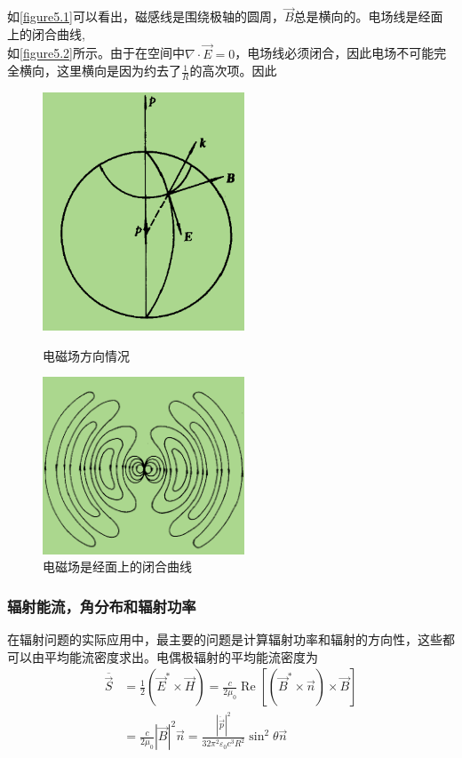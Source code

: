 \documentclass[UTF8]{ctexart}
\begin{document}
\noindent 如\autoref{figure5.1}可以看出，磁感线是围绕极轴的圆周，$\vec{B}$总是横向的。电场线是经面上的闭合曲线,\\如\autoref{figure5.2}所示。由于在空间中$\nabla \cdot \vec{E} = 0$，电场线必须闭合，因此电场不可能完全横向，这里横向是因为约去了$\frac{1}{R}$的高次项。因此
\begin{figure}[htbp]
   \centering
   \begin{minipage}[t]{0.48 \textwidth}
       \centering
       \includegraphics[width=6cm]{figure5-1.png}
       \caption{电磁场方向情况}
   \end{minipage}
   \label{figure5.1}
   \begin{minipage}[t]{0.48 \textwidth}
       \centering
       \includegraphics[width=6cm]{figure5-2.png}
       \caption{电磁场是经面上的闭合曲线}
   \end{minipage}
   \label{figure5.2}
   \end{figure}

   \subsubsection{辐射能流，角分布和辐射功率}
   在辐射问题的实际应用中，最主要的问题是计算辐射功率和辐射的方向性，这些都可以由平均能流密度求出。电偶极辐射的平均能流密度为
   \begin{equation}
       \begin{aligned}
           \overline{\vec{S}} &=\frac{1}{2} (\vec{E}^* \times \vec{H}) = \frac{c}{2 \mu_0} \operatorname{Re}\left[(\vec{B}^* \times \vec{n}) \times \vec{B}\right] \\
           &= \frac{c}{2 \mu_0} |\vec{B}|^2 \vec{n} = \frac{|\ddot{\vec{p}}|^2}{32 \pi^2 \varepsilon_0 c^3 R^2} \sin^2 \theta \vec{n}
       \end{aligned}
   \end{equation}
\end{document}
